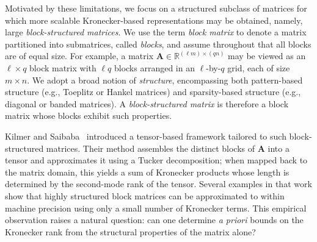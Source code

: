 \documentclass{siamart251216}
\newcommand{\RR}[2]{\mathbb{R}^{#1 \times #2}}
\def\bA{\mathbf{A}}
\begin{document}
Motivated by these limitations, we focus on a structured subclass of matrices for which more scalable Kronecker-based representations may be obtained, namely, large \emph{block-structured matrices}. We use the term \emph{block matrix} to denote a matrix partitioned into submatrices, called \emph{blocks}, and assume throughout that all blocks are of equal size. For example, a matrix $\bA \in \RR{(\ell m)}{(qn)}$ may be viewed as an $\ell \times q$ block matrix with $\ell q$ blocks arranged in an $\ell$-by-$q$ grid, each of size $m\times n$. We adopt a broad notion of \emph{structure}, encompassing both pattern-based structure (e.g., Toeplitz or Hankel matrices) and sparsity-based structure (e.g., diagonal or banded matrices). A \emph{block-structured matrix} is therefore a block matrix whose blocks exhibit such properties.

Kilmer and Saibaba~\cite{kilmer2022matrixtensordecomp} introduced a tensor-based framework tailored to such block-structured matrices. Their method assembles the distinct blocks of $\bA$ into a tensor and approximates it using a Tucker decomposition; when mapped back to the matrix domain, this yields a sum of Kronecker products whose length is determined by the second-mode rank of the tensor. Several examples in that work show that highly structured block matrices can be approximated to within machine precision using only a small number of Kronecker terms. This empirical observation raises a natural question: can one determine \emph{a priori} bounds on the Kronecker rank from the structural properties of the matrix alone?
\end{document}

